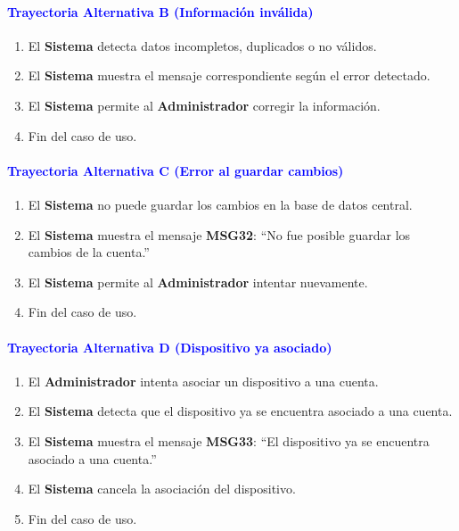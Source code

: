 \paragraph{\textbf{\textcolor{blue}{Trayectoria Alternativa B (Información inválida)}}}
\begin{enumerate}
    \item El \textbf{Sistema} detecta datos incompletos, duplicados o no válidos.
    \item El \textbf{Sistema} muestra el mensaje correspondiente según el error detectado.
    \item El \textbf{Sistema} permite al \textbf{Administrador} corregir la información.
    \item Fin del caso de uso.
\end{enumerate}

\paragraph{\textbf{\textcolor{blue}{Trayectoria Alternativa C (Error al guardar cambios)}}}
\begin{enumerate}
    \item El \textbf{Sistema} no puede guardar los cambios en la base de datos central.
    \item El \textbf{Sistema} muestra el mensaje \textbf{MSG32}: ``No fue posible guardar los cambios de la cuenta.''
    \item El \textbf{Sistema} permite al \textbf{Administrador} intentar nuevamente.
    \item Fin del caso de uso.
\end{enumerate}

\paragraph{\textbf{\textcolor{blue}{Trayectoria Alternativa D (Dispositivo ya asociado)}}}
\begin{enumerate}
    \item El \textbf{Administrador} intenta asociar un dispositivo a una cuenta.
    \item El \textbf{Sistema} detecta que el dispositivo ya se encuentra asociado a una cuenta.
    \item El \textbf{Sistema} muestra el mensaje \textbf{MSG33}: ``El dispositivo ya se encuentra asociado a una cuenta.''
    \item El \textbf{Sistema} cancela la asociación del dispositivo.
    \item Fin del caso de uso.
\end{enumerate}